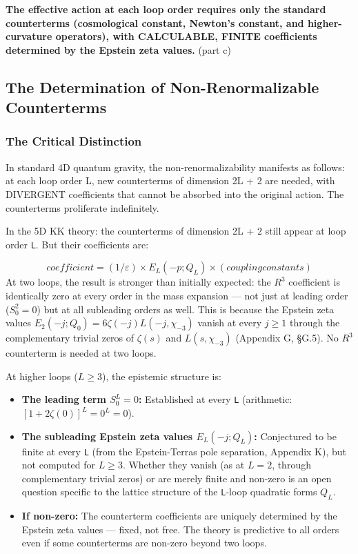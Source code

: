 \documentclass[aps,prd,preprint,superscriptaddress,longbibliography,floatfix]{revtex4-2}
\theoremstyle{remark}
\begin{document}
\textbf{The effective action at each loop order requires only the standard counterterms (cosmological constant, Newton's constant, and higher-curvature operators), with CALCULABLE, FINITE coefficients determined by the Epstein zeta values.} (part c)



\subsection{The Determination of Non-Renormalizable Counterterms}


\subsubsection{The Critical Distinction}

In standard 4D quantum gravity, the non-renormalizability manifests as follows: at each loop order L, new counterterms of dimension 2L + 2 are needed, with DIVERGENT coefficients that cannot be absorbed into the original action. The counterterms proliferate indefinitely.

In the 5D KK theory: the counterterms of dimension 2L + 2 still appear at loop order \texttt{L}. But their coefficients are:


\begin{equation}
    coefficient = (1/\varepsilon) \times E_L(-p; Q_L) \times (coupling constants)
\end{equation}
At two loops, the result is stronger than initially expected: the $R^{3}$ coefficient is identically zero at every order in the mass expansion --- not just at leading order ($S_{0}^{2} = 0$) but at all subleading orders as well. This is because the Epstein zeta values $E_{2}(-j; Q_{0}) = 6\zeta(-j)L(-j, \chi_{-3})$ vanish at every $j \geq 1$ through the complementary trivial zeros of $\zeta(s)$ and $L(s, \chi_{-3})$ (Appendix G, \S{}G.5). No $R^{3}$ counterterm is needed at two loops.

At higher loops ($L \geq 3$), the epistemic structure is:


\begin{itemize}
  \item \textbf{The leading term $S_{0}^L = 0$:} Established at every \texttt{L} (arithmetic: $[1 + 2\zeta(0)]^L = 0^L = 0$).
  \item \textbf{The subleading Epstein zeta values $E_L(-j; Q_L)$:} Conjectured to be finite at every \texttt{L} (from the Epstein-Terras pole separation, Appendix K), but not computed for $L \geq 3$. Whether they vanish (as at $L = 2$, through complementary trivial zeros) or are merely finite and non-zero is an open question specific to the lattice structure of the \texttt{L}-loop quadratic forms $Q_L$.
  \item \textbf{If non-zero:} The counterterm coefficients are uniquely determined by the Epstein zeta values --- fixed, not free. The theory is predictive to all orders even if some counterterms are non-zero beyond two loops.
\end{itemize}
\end{document}
